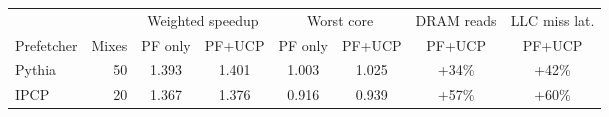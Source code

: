 \begin{tabular}{lrcccccc}
\toprule
 & & \multicolumn{2}{c}{Weighted speedup} & \multicolumn{2}{c}{Worst core} & DRAM reads & LLC miss lat. \\
\cmidrule(lr){3-4}\cmidrule(lr){5-6}
Prefetcher & Mixes & PF only & PF+UCP & PF only & PF+UCP & PF+UCP & PF+UCP \\
\midrule
Pythia & 50 & 1.393 & 1.401 & 1.003 & 1.025 & +34\% & +42\% \\
IPCP & 20 & 1.367 & 1.376 & 0.916 & 0.939 & +57\% & +60\% \\
\bottomrule
\end{tabular}
